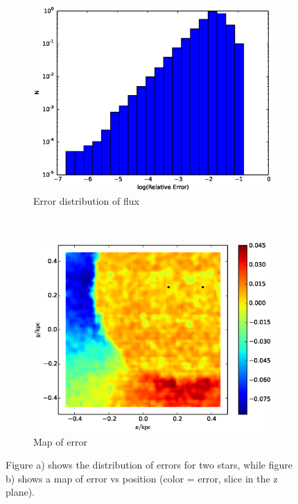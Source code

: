 \begin{figure}
        \centering
        \begin{subfigure}[b]{0.45\textwidth}
                \includegraphics[width=\textwidth]{graphics/error2star.eps}
                \caption{Error distribution of flux}
                \label{fig:2starerrordist}
        \end{subfigure}
        ~ 
        \begin{subfigure}[b]{0.45\textwidth}
                \includegraphics[width=\textwidth]{graphics/error2starMap.eps}
                \caption{Map of error}
                \label{fig:2starerrormap}
        \end{subfigure}
        \caption[Flux error for two star configuration]{Figure a) shows the distribution of errors for two stars, while figure b) shows a map of error vs position (color = error, slice in the z plane).}
        \label{fig:2starerror}
\end{figure}

